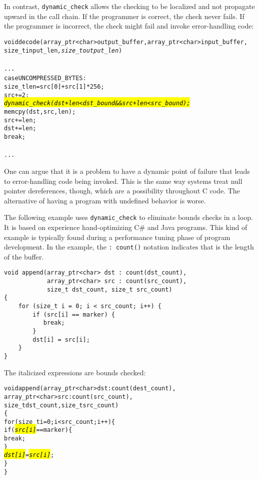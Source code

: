 In contrast, \texttt{dynamic\_check} allows the checking to be localized
and not propagate upward in the call chain. If the programmer is
correct, the check never fails. If the programmer is incorrect, the
check might fail and invoke error-handling code:

\begin{alltt}
void decode(array\_ptr<char> output\_buffer, array\_ptr<char> input\_buffer, 
            size\_t input\_len\textit{, size\_t output\_len})
{
      ...
            case UNCOMPRESSED\_BYTES: { 
                size\_t len = src[0] + src[1]*256;
                src += 2;
                \hl{\textit{dynamic\_check(dst + len < dst\_bound && src + len < src_bound);}}
                memcpy(dst, src, len);
                src += len;
                dst += len;                
                break;
            }
   ...
}
\end{alltt}

One can argue that it is a problem to have a dynamic point of failure
that leads to error-handling code being invoked. This is the same way
systems treat null pointer dereferences, though, which are a possibility
throughout C code. The alternative of having a program with undefined
behavior is worse.

The following example uses \texttt{dynamic\_check} to eliminate bounds
checks in a loop. It is based on experience hand-optimizing C\# and Java
programs. This kind of example is typically found during a performance
tuning phase of program development. In the example, 
the \verb|: count(|\verb|)| notation indicates that  is the
length of the buffer.

\begin{verbatim}
void append(array_ptr<char> dst : count(dst_count),
            array_ptr<char> src : count(src_count), 
            size_t dst_count, size_t src_count)
{ 
    for (size_t i = 0; i < src_count; i++) {
        if (src[i] == marker) {
           break;
        }
        dst[i] = src[i];
    }
}
\end{verbatim}

The italicized expressions are bounds checked:
\begin{alltt}
void append(array\_ptr<char> dst: count(dest\_count), 
            array\_ptr<char> src : count(src\_count), 
            size\_t dst\_count, size\_t src\_count)
\{ 
    for (size\_t i = 0; i < src\_count; i++) \{
        if (\hl{\textit{src[i]}} == marker) \{
           break;
        \}
        \hl{\textit{dst[i]}} = \hl{\textit{src[i]}};
    \}
\}
\end{alltt}

